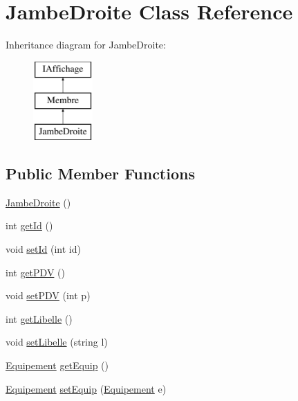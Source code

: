 \hypertarget{class_jambe_droite}{\section{\-Jambe\-Droite \-Class \-Reference}
\label{class_jambe_droite}
}
\-Inheritance diagram for \-Jambe\-Droite\-:\begin{figure}[H]
\begin{center}
\leavevmode
\includegraphics[height=3.000000cm]{class_jambe_droite}
\end{center}
\end{figure}
\subsection*{\-Public \-Member \-Functions}
\begin{DoxyCompactItemize}
\item 
\hyperlink{class_jambe_droite_a22f040786d3645d93c29c131b4041237}{\-Jambe\-Droite} ()
\item 
int \hyperlink{class_jambe_droite_a4dc14c64b239851e5497dc84ca43f6de}{get\-Id} ()
\item 
void \hyperlink{class_jambe_droite_ae8840e4f8b4240a24dbdb7311cf49b45}{set\-Id} (int id)
\item 
int \hyperlink{class_jambe_droite_ab652890a9d08fd39f231dcf9bba48068}{get\-P\-D\-V} ()
\item 
void \hyperlink{class_jambe_droite_a720931176b5219a1ef11e5d255910fbe}{set\-P\-D\-V} (int p)
\item 
int \hyperlink{class_jambe_droite_a236e542d759b7142a42d861612a9ac68}{get\-Libelle} ()
\item 
void \hyperlink{class_jambe_droite_ab45dd17c1fcc3de07b55c13a27bf9699}{set\-Libelle} (string l)
\item 
\hyperlink{class_equipement}{\-Equipement} \hyperlink{class_jambe_droite_a4a9ac6e20a14d99b6db5ce2fd0af4aa0}{get\-Equip} ()
\item 
\hyperlink{class_equipement}{\-Equipement} \hyperlink{class_jambe_droite_a1f8dc857d14b8bfb005dcf633e56f8d3}{set\-Equip} (\hyperlink{class_equipement}{\-Equipement} e)
\end{DoxyCompactItemize}


